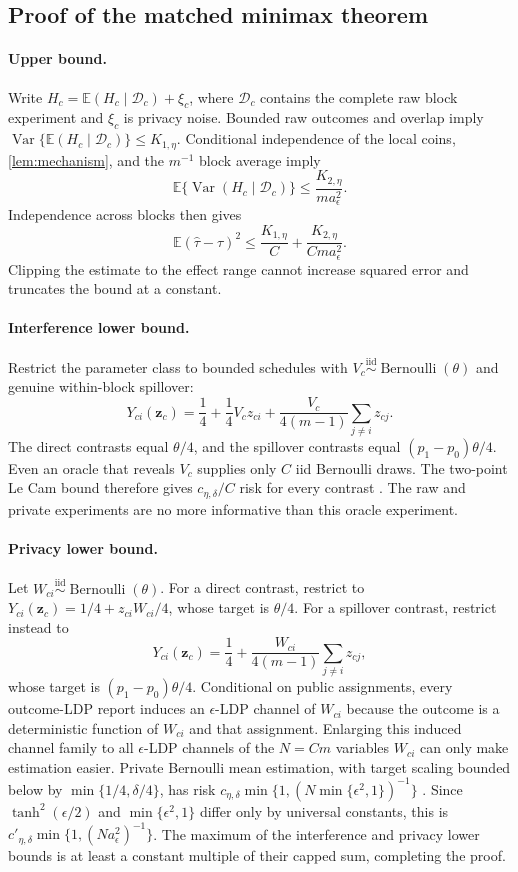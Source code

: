 \documentclass[10pt]{article}
\theoremstyle{definition}
\theoremstyle{remark}
\newcommand{\E}{\mathbb{E}}
\newcommand{\Var}{\operatorname{Var}}
\newcommand{\doisig}{a_{\epsilon}}
\DeclareMathOperator{\Bern}{Bernoulli}
\begin{document}
\subsection{Proof of the matched minimax theorem}

\paragraph{Upper bound.}
Write $H_c=\E(H_c\mid\mathcal D_c)+\xi_c$, where $\mathcal D_c$ contains the complete raw
block experiment and $\xi_c$ is privacy noise. Bounded raw outcomes and overlap imply
$\Var\{\E(H_c\mid\mathcal D_c)\}\le K_{1,\eta}$. Conditional independence of the local coins,
\cref{lem:mechanism}, and the $m^{-1}$ block average imply
\[
  \E\{\Var(H_c\mid\mathcal D_c)\}
  \le \frac{K_{2,\eta}}{m\doisig^2}.
\]
Independence across blocks then gives
\[
  \E(\widehat\tau-\tau)^2
  \le \frac{K_{1,\eta}}{C}
  +\frac{K_{2,\eta}}{Cm\doisig^2}.
\]
Clipping the estimate to the effect range cannot increase squared error and truncates the bound
at a constant.

\paragraph{Interference lower bound.}
Restrict the parameter class to bounded schedules with
$V_c\stackrel{\mathrm{iid}}{\sim}\Bern(\theta)$ and genuine within-block spillover:
\[
Y_{ci}(\mathbf z_c)
=\frac14+\frac14V_cz_{ci}
+\frac{V_c}{4(m-1)}\sum_{j\ne i}z_{cj}.
\]
The direct contrasts equal $\theta/4$, and the spillover contrasts equal
$(p_1-p_0)\theta/4$. Even an oracle that reveals $V_c$ supplies only $C$ iid Bernoulli draws.
The two-point Le Cam bound therefore gives $c_{\eta,\delta}/C$ risk for every contrast
\citep{Yu1997,Tsybakov2009}. The raw and private experiments are no more informative than this
oracle experiment.

\paragraph{Privacy lower bound.}
Let $W_{ci}\stackrel{\mathrm{iid}}{\sim}\Bern(\theta)$. For a direct contrast, restrict to
$Y_{ci}(\mathbf z_c)=1/4+z_{ci}W_{ci}/4$, whose target is $\theta/4$. For a spillover contrast,
restrict instead to
\[
Y_{ci}(\mathbf z_c)=\frac14+
\frac{W_{ci}}{4(m-1)}\sum_{j\ne i}z_{cj},
\]
whose target is $(p_1-p_0)\theta/4$. Conditional on public assignments, every outcome-LDP
report induces an $\epsilon$-LDP channel of $W_{ci}$ because the outcome is a deterministic
function of $W_{ci}$ and that assignment. Enlarging this induced channel family to all
$\epsilon$-LDP channels of the $N=Cm$ variables $W_{ci}$ can only make estimation easier.
Private Bernoulli mean estimation, with target scaling bounded below by
$\min\{1/4,\delta/4\}$, has risk
$c_{\eta,\delta}\min\{1,(N\min\{\epsilon^2,1\})^{-1}\}$
\citep{DuchiJordanWainwright2018}. Since
$\tanh^2(\epsilon/2)$ and $\min\{\epsilon^2,1\}$ differ only by universal constants, this is
$c'_{\eta,\delta}\min\{1,(N\doisig^2)^{-1}\}$. The maximum of the interference and privacy
lower bounds is at least a constant multiple of their capped sum, completing the proof.
\end{document}
